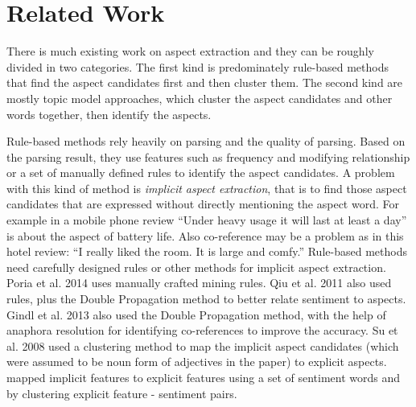 \section{Related Work}
\label{sec:related}

There is much existing work on aspect extraction and they can be 
roughly divided in two categories. The first kind is predominately rule-based
methods that find the aspect candidates first and then cluster them. 
The second kind are mostly topic model approaches, which cluster the 
aspect candidates and other words together, then identify the aspects.

Rule-based methods rely heavily on parsing and the quality of parsing. 
Based on the parsing result, they use features such as frequency and 
modifying relationship or a set of manually defined rules to identify 
the aspect candidates. A problem with this kind of method is 
\emph{implicit aspect extraction}, that is to find those aspect candidates 
that are expressed without directly mentioning the aspect word. 
For example in a mobile phone review ``Under heavy usage it will last 
at least a day'' is about the aspect of battery life. Also co-reference 
may be a problem as in this hotel review: ``I really liked the room. 
It is large and comfy.'' Rule-based methods need carefully designed rules 
or other methods for implicit aspect extraction.
Poria et al. 2014 \cite{poria2014rule} uses manually crafted mining rules. 
Qiu et al. 2011 \cite{qiu2011opinion} also used rules, plus the 
Double Propagation method to better relate sentiment to aspects. 
Gindl et al. 2013 \cite{gindl2013rule} also used the Double Propagation 
method, with the help of anaphora resolution for identifying 
co-references to improve the accuracy. 
Su et al. 2008 \cite{su2008hidden} used a clustering method to map 
the implicit aspect candidates (which were assumed to be noun form 
of adjectives in the paper) to explicit aspects. 
\cite{zeng2013classification} mapped implicit features to explicit 
features using a set of sentiment words and by clustering explicit 
feature - sentiment pairs.

